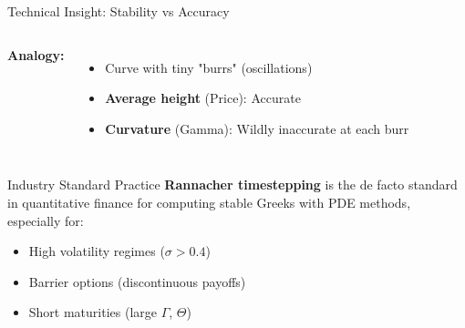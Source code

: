 \begin{frame}{Technical Insight: Stability vs Accuracy}
\begin{columns}
\vspace{0.3em}
\textbf{Analogy:}
\begin{itemize}
    \item Curve with tiny "burrs" (oscillations)
    \item \textbf{Average height} (Price): Accurate
    \item \textbf{Curvature} (Gamma): Wildly inaccurate at each burr
\end{itemize}
\end{columns}

\vspace{0.5em}
\begin{alertblock}{Industry Standard Practice}
\textbf{Rannacher timestepping} is the de facto standard in quantitative finance for computing stable Greeks with PDE methods, especially for:
\begin{itemize}
    \item High volatility regimes ($\sigma > 0.4$)
    \item Barrier options (discontinuous payoffs)
    \item Short maturities (large $\Gamma$, $\Theta$)
\end{itemize}
\end{alertblock}

\end{frame}
